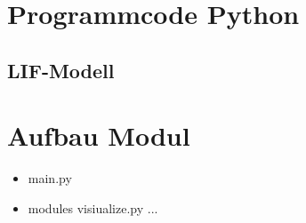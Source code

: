 \appendix
%
\chapter{Programmcode Python}
%

\section{LIF-Modell}
\label{sec:lifpy}


%
\chapter{Aufbau Modul}
%

\begin{itemize}
	\item main.py
	\item modules
		\subitem visiualize.py
		\subitem ...
\end{itemize}


